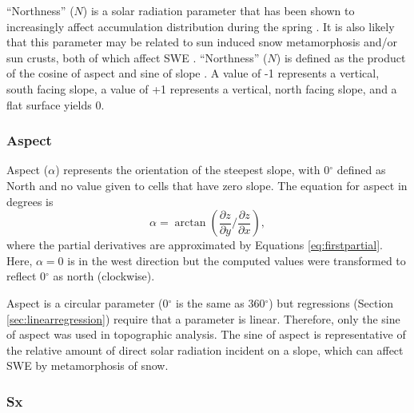 \documentclass{sfuthesis}
\begin{document}
``Northness'' ($N$) is a solar radiation parameter that has been shown to  increasingly affect accumulation distribution during the spring \citep{Revuelto2014}. It is also likely that this parameter may be related to sun induced snow metamorphosis and/or sun crusts, both of which affect SWE \citep{McGrath2015}. ``Northness'' ($N$) is defined as the product of the cosine of aspect and sine of slope \citep{Molotch2005}. A value of -1 represents a vertical, south facing slope, a value of +1 represents a vertical, north facing slope, and a flat surface yields 0. 

\subsubsection*{Aspect} 

Aspect ($\alpha$) represents the orientation of the steepest slope, with 0${^\circ}$ defined as North and no value given to cells that have zero slope. The equation for aspect in degrees is \citep{Neteler2008}
	\begin{equation}
	\alpha = \arctan\left(\frac{\partial z}{\partial y} \bigg/ \frac{\partial z}{\partial x}\right), 
	\end{equation}
where the partial derivatives are approximated by Equations \ref{eq:firstpartial}. Here, $\alpha = 0$ is in the west direction but the computed values were transformed to reflect 0${^\circ}$ as north (clockwise). 

Aspect is a circular parameter (0${^\circ}$ is the same as 360${^\circ}$) but regressions (Section \ref{sec:linearregression}) require that a parameter is linear. Therefore, only the sine of aspect was used in topographic analysis. The sine of aspect is representative of the relative amount of direct solar radiation incident on a slope, which can affect SWE by metamorphosis of snow. 

\subsubsection*{Sx} 
\end{document}
